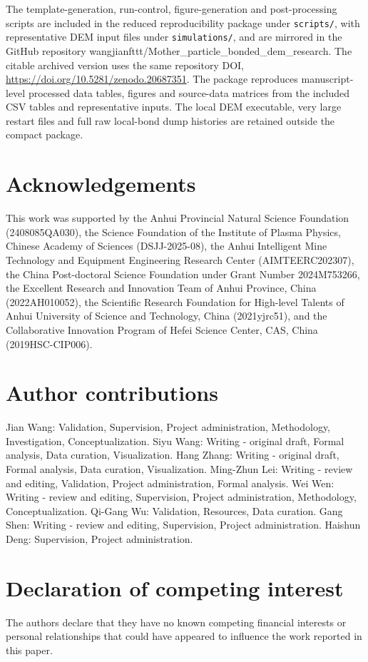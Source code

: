 \documentclass[preprint,12pt]{elsarticle}
\begin{document}
The template-generation, run-control, figure-generation and post-processing scripts are included in the reduced reproducibility package under \texttt{scripts/}, with representative DEM input files under \texttt{simulations/}, and are mirrored in the GitHub repository wangjianfttt/Mother\_particle\_bonded\_dem\_research. The citable archived version uses the same repository DOI, \url{https://doi.org/10.5281/zenodo.20687351}. The package reproduces manuscript-level processed data tables, figures and source-data matrices from the included CSV tables and representative inputs. The local DEM executable, very large restart files and full raw local-bond dump histories are retained outside the compact package.


\section{Acknowledgements}

This work was supported by the Anhui Provincial Natural Science Foundation (2408085QA030), the Science Foundation of the Institute of Plasma Physics, Chinese Academy of Sciences (DSJJ-2025-08), the Anhui Intelligent Mine Technology and Equipment Engineering Research Center (AIMTEERC202307), the China Post-doctoral Science Foundation under Grant Number 2024M753266, the Excellent Research and Innovation Team of Anhui Province, China (2022AH010052), the Scientific Research Foundation for High-level Talents of Anhui University of Science and Technology, China (2021yjrc51), and the Collaborative Innovation Program of Hefei Science Center, CAS, China (2019HSC-CIP006).


\section{Author contributions}

Jian Wang: Validation, Supervision, Project administration, Methodology, Investigation, Conceptualization. Siyu Wang: Writing - original draft, Formal analysis, Data curation, Visualization. Hang Zhang: Writing - original draft, Formal analysis, Data curation, Visualization. Ming-Zhun Lei: Writing - review and editing, Validation, Project administration, Formal analysis. Wei Wen: Writing - review and editing, Supervision, Project administration, Methodology, Conceptualization. Qi-Gang Wu: Validation, Resources, Data curation. Gang Shen: Writing - review and editing, Supervision, Project administration. Haishun Deng: Supervision, Project administration.


\section{Declaration of competing interest}

The authors declare that they have no known competing financial interests or personal relationships that could have appeared to influence the work reported in this paper.





\end{document}
